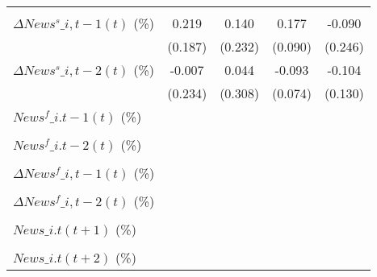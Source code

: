 {\begin{tabular}{l*{4}{c}}
                    &                     &                     &                     &                     \\
\addlinespace
$ \Delta News^s\_{i,t-1}(t)$ (\%)&       0.219         &       0.140         &       0.177\sym{*}  &      -0.090         \\
                    &     (0.187)         &     (0.232)         &     (0.090)         &     (0.246)         \\
\addlinespace
$ \Delta News^s\_{i,t-2}(t)$ (\%)&      -0.007         &       0.044         &      -0.093         &      -0.104         \\
                    &     (0.234)         &     (0.308)         &     (0.074)         &     (0.130)         \\
\addlinespace
$ News^f\_{i.t-1}(t)$ (\%)&                     &                     &                     &                     \\
                    &                     &                     &                     &                     \\
\addlinespace
$ News^f\_{i.t-2}(t)$ (\%)&                     &                     &                     &                     \\
                    &                     &                     &                     &                     \\
\addlinespace
$ \Delta News^f\_{i,t-1}(t)$ (\%)&                     &                     &                     &                     \\
                    &                     &                     &                     &                     \\
\addlinespace
$ \Delta News^f\_{i,t-2}(t)$ (\%)&                     &                     &                     &                     \\
                    &                     &                     &                     &                     \\
\addlinespace
$ News\_{i.t}(t+1)$ (\%)&                     &                     &                     &                     \\
                    &                     &                     &                     &                     \\
\addlinespace
$ News\_{i.t}(t+2)$ (\%)&                     &                     &                     &                     \\

\end{tabular}}
